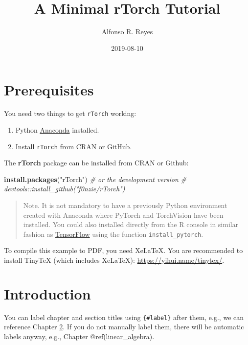 \documentclass[]{book}
\title{A Minimal rTorch Tutorial}
\author{Alfonso R. Reyes}
\date{2019-08-10}
\newenvironment{Shaded}{\begin{snugshade}}{\end{snugshade}}
\newcommand{\CommentTok}[1]{\textcolor[rgb]{0.56,0.35,0.01}{\textit{#1}}}
\newcommand{\KeywordTok}[1]{\textcolor[rgb]{0.13,0.29,0.53}{\textbf{#1}}}
\newcommand{\NormalTok}[1]{#1}
\newcommand{\StringTok}[1]{\textcolor[rgb]{0.31,0.60,0.02}{#1}}
\begin{document}
\maketitle

{
\setcounter{tocdepth}{1}
\tableofcontents
}
\hypertarget{prerequisites}{%
\chapter{Prerequisites}\label{prerequisites}}

You need two things to get \texttt{rTorch} working:

\begin{enumerate}
\def\labelenumi{\arabic{enumi}.}
\item
  Python \href{}{Anaconda} installed.
\item
  Install \texttt{rTorch} from CRAN or GitHub.
\end{enumerate}

The \textbf{rTorch} package can be installed from CRAN or Github:

\begin{Shaded}
\begin{Highlighting}[]
\KeywordTok{install.packages}\NormalTok{(}\StringTok{"rTorch"}\NormalTok{)}
\CommentTok{# or the development version}
\CommentTok{# devtools::install_github("f0nzie/rTorch")}
\end{Highlighting}
\end{Shaded}

\begin{quote}
Note. It is not mandatory to have a previously Python environment created with Anaconda where PyTorch and TorchVision have been installed. You could also installed directly from the R console in similar fashion as \href{}{TensorFlow} using the function \texttt{install\_pytorch}.
\end{quote}

To compile this example to PDF, you need XeLaTeX. You are recommended to install TinyTeX (which includes XeLaTeX): \url{https://yihui.name/tinytex/}.

\hypertarget{intro}{%
\chapter{Introduction}\label{intro}}

You can label chapter and section titles using \texttt{\{\#label\}} after them, e.g., we can reference Chapter \ref{intro}. If you do not manually label them, there will be automatic labels anyway, e.g., Chapter @ref(linear\_algebra).
\end{document}
